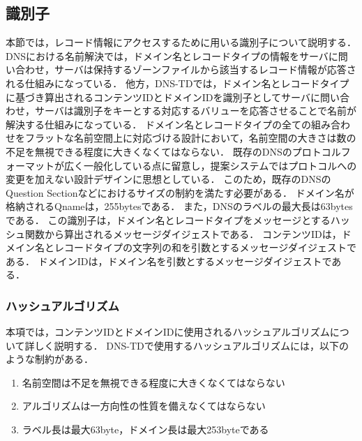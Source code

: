 \newpage
\subsection{識別子}
本節では，レコード情報にアクセスするために用いる識別子について説明する．
DNSにおける名前解決では，ドメイン名とレコードタイプの情報をサーバに問い合わせ，サーバは保持するゾーンファイルから該当するレコード情報が応答される仕組みになっている．
他方，DNS-TDでは，ドメイン名とレコードタイプに基づき算出されるコンテンツIDとドメインIDを識別子としてサーバに問い合わせ，サーバは識別子をキーとする対応するバリューを応答させることで名前が解決する仕組みになっている．
ドメイン名とレコードタイプの全ての組み合わせをフラットな名前空間上に対応づける設計において，名前空間の大きさは数の不足を無視できる程度に大きくなくてはならない．
既存のDNSのプロトコルフォーマットが広く一般化している点に留意し，提案システムではプロトコルへの変更を加えない設計デザインに思想としている．
このため，既存のDNSのQuestion Sectionなどにおけるサイズの制約を満たす必要がある．
ドメイン名が格納されるQnameは，255bytesである．
また，DNSのラベルの最大長は63bytesである．
この識別子は，ドメイン名とレコードタイプをメッセージとするハッシュ関数から算出されるメッセージダイジェストである．
コンテンツIDは，ドメイン名とレコードタイプの文字列の和を引数とするメッセージダイジェストである．
ドメインIDは，ドメイン名を引数とするメッセージダイジェストである．


\subsubsection{ハッシュアルゴリズム}
本項では，コンテンツIDとドメインIDに使用されるハッシュアルゴリズムについて詳しく説明する．
DNS-TDで使用するハッシュアルゴリズムには，以下のような制約がある．

\begin{enumerate}
 \item 名前空間は不足を無視できる程度に大きくなくてはならない
 \vspace{-3mm}
 \item アルゴリズムは一方向性の性質を備えなくてはならない
 \vspace{-3mm}
 \item ラベル長は最大63byte，ドメイン長は最大253byteである
 \vspace{-3mm}
\end{enumerate}

